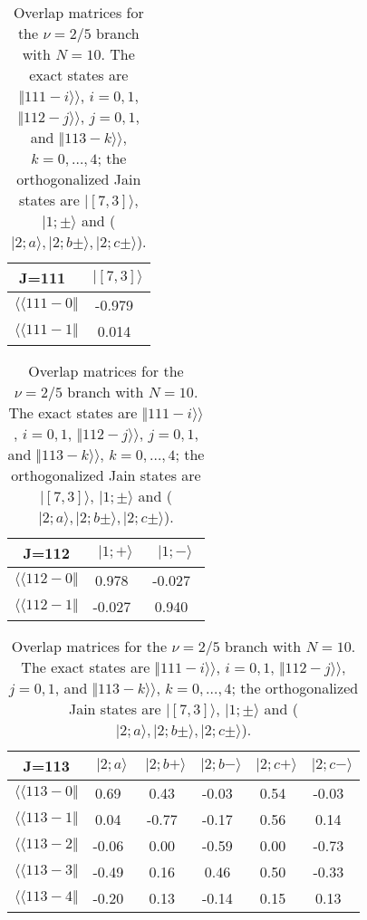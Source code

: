 \begin{table}
\caption{Overlap matrices for the $\nu=2/5$ branch with $N=10$.
The exact states are $\Vert 111-i \rangle\rangle$, $i=0,1$, 
$\Vert 112-j \rangle\rangle$, $j=0,1$, and 
$\Vert 113-k \rangle\rangle$, $k=0,\dots,4$; 
the orthogonalized Jain states are
$\vert [7,3] \rangle$, $\vert 1;\pm\rangle$ and
($\vert 2;a\rangle,\vert2;b\pm\rangle,\vert 2;c\pm\rangle$).} 
\label{tab60}
\vspace{0.4cm}
\begin{center}
\begin{tabular}{|c|c|} 
\hline
J=111\  & $\vert [7,3] \rangle$  \\ 
\hline
$\langle\langle 111-0\Vert$  &-0.979\ \\ 
$\langle\langle 111-1\Vert$  & 0.014\ \\
\end{tabular}
\begin{tabular}{|c|c|c|} 
J=112    & $\vert 1; +\rangle$  & $\vert 1;-\rangle$  \\ 
\hline
$\langle\langle 112-0\Vert$ & 0.978\ &-0.027\  \\
$\langle\langle 112-1\Vert$ &-0.027\ & 0.940\  \\
\end{tabular}
\begin{tabular}{|c|c|c|c|c|c|} 
J=113 & $\vert 2;a\rangle$ & $\vert 2;b+\rangle$ & $\vert 2;b-\rangle$ &
$\vert 2;c+\rangle$ & $\vert 2;c-\rangle$ \\
\hline
$\langle\langle 113-0\Vert$ & 0.69\ & 0.43\ &-0.03\ & 0.54\ &-0.03\ \\
$\langle\langle 113-1\Vert$ & 0.04\ &-0.77\ &-0.17\ & 0.56\ & 0.14\ \\
$\langle\langle 113-2\Vert$ &-0.06\ & 0.00\ &-0.59\ & 0.00\ &-0.73\ \\
$\langle\langle 113-3\Vert$ &-0.49\ & 0.16\ & 0.46\ & 0.50\ &-0.33\ \\
$\langle\langle 113-4\Vert$ &-0.20\ & 0.13\ &-0.14\ & 0.15\ & 0.13\ \\
\hline
\end{tabular}
\end{center}
\end{table}


